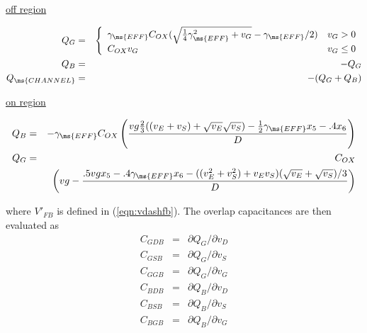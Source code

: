 {\noindent \underline{off region}

\begin{eqnarray}
Q_G &=& \left\{ \begin{array}{ll}
       \gamma_{\ms{EFF}} C_{OX}
       ( \sqrt{\frac{1}{4}\gamma_{\ms{EFF}}^2 + v_G} - \gamma_{\ms{EFF}}/2 )
                                      & v_G > 0 \\
       C_{OX} v_G                     & v_G \le 0
       \end{array} \right. %
       \\
  Q_B &=& -Q_G\\
  Q_{\ms{CHANNEL}} &=& -( Q_G + Q_B )
\end{eqnarray}


\noindent \underline{on region}


\begin{eqnarray}
    Q_B &=& -\gamma_{\ms{EFF}} C_{OX}
          \left( {{\textstyle
             vg \frac{2}{3} ( (v_E+v_S) + \sqrt{v_E}\sqrt{v_S} )
             - \frac{1}{2} \gamma_{\ms{EFF}} x_5
             - .4 x_6 } \over {\textstyle D}} \right) \\
    Q_G &=& C_{OX} \nonumber \\
        &&   \left( vg - {{\textstyle .5 vg x_5 - .4 \gamma_{\ms{EFF}} x_6
             - ((v_E^2+v_S^2) + v_Ev_S)(\sqrt{v_E}+\sqrt{v_S})/3
 } \over{\textstyle D}} \right)
\end{eqnarray}

where $V'_{FB}$ is defined in (\ref{eqn:vdashfb}). \noindent The
overlap capacitances are then evaluated as
\begin{eqnarray}
    C_{GDB}  &=& \partial Q_G / \partial v_D\\
    C_{GSB}  &=& \partial Q_G / \partial v_S\\
    C_{GGB}  &=& \partial Q_G / \partial v_G\\
    C_{BDB}  &=& \partial Q_B / \partial v_D\\
    C_{BSB}  &=& \partial Q_B / \partial v_S\\
    C_{BGB}  &=& \partial Q_B / \partial v_G
\end{eqnarray}

}
